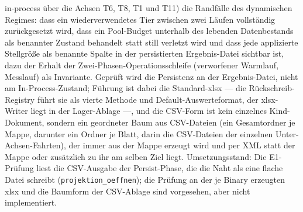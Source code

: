 \begin{nurlang}
in-process über die Achsen T6, T8, T1 und T11) die Randfälle des dynamischen Regimes: dass ein
wiederverwendetes Tier zwischen zwei Läufen vollständig zurückgesetzt wird, dass ein Pool-Budget
unterhalb des lebenden Datenbestands als benannter Zustand behandelt statt still verletzt wird und dass
jede applizierte Stellgröße als benannte Spalte in der persistierten Ergebnis-Datei sichtbar ist, dazu der
Erhalt der Zwei-Phasen-Operationsschleife (verworfener Warmlauf, Messlauf) als Invariante.
Geprüft wird die Persistenz an der Ergebnis-Datei, nicht am In-Process-Zustand; Führung ist dabei die
Standard-xlsx --- die Rückschreib-Registry führt sie als vierte Methode und Default-Auswerteformat, der
xlsx-Writer liegt in der Lager-Ablage ---, und die CSV-Form ist kein einzelnes Kind-Dokument, sondern ein
geordneter Baum aus CSV-Dateien (ein Gesamtordner je Mappe, darunter ein Ordner je Blatt, darin die
CSV-Dateien der einzelnen Unter-Achsen-Fahrten), der immer aus der Mappe erzeugt wird und per XML statt
der Mappe oder zusätzlich zu ihr am selben Ziel liegt. Umsetzungsstand: Die E1-Prüfung liest die
CSV-Ausgabe der Persist-Phase, die die Naht als eine flache Datei schreibt
(\texttt{projektion\_\allowbreak{}oeffnen}); die Prüfung an der je Binary erzeugten xlsx und die Baumform
der CSV-Ablage sind vorgesehen, aber nicht implementiert.


\end{nurlang}
